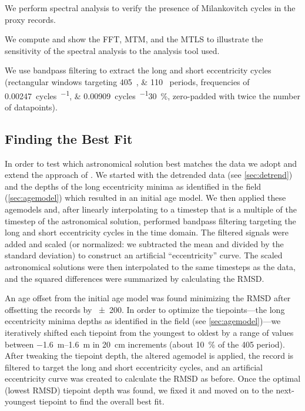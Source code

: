\documentclass[draft]{agujournal2019}
\begin{document}
We perform spectral analysis to verify the presence of Milankovitch cycles in the proxy records.

We compute and show the \gls{FFT}, %
\gls{MTM}, and the \gls{MTLS} to illustrate the sensitivity of the spectral analysis to the analysis tool used.

We use bandpass filtering to extract the long and short eccentricity cycles (rectangular windows targeting \qtylist{405;110}{\kiloyear} periods, frequencies of \qtylist{0.00247;0.00909}{cycles\per\kiloyear}\textpm\qty{30}{\percent}, zero-padded with twice the number of datapoints).

\subsection{Finding the Best Fit}\label{sec:algorithm}

In order to test which astronomical solution best matches the data we adopt and extend the approach of .
We started with the detrended data (see \cref{sec:detrend}) and the depths of the long eccentricity minima as identified in the field (\cref{sec:agemodel}) which resulted in an initial age model.
We then applied these agemodels and, after linearly interpolating to a timestep that is a multiple of the timestep of the astronomical solution, performed bandpass filtering targeting the long and short eccentricity cycles in the time domain.
The filtered signals were added and scaled (or normalized: we subtracted the mean and divided by the standard deviation) to construct an artificial ``eccentricity'' curve.
The scaled astronomical solutions were then interpolated to the same timesteps as the data, and the squared differences were summarized by calculating the \gls{RMSD}.

An age offset from the initial age model was found minimizing the \gls{RMSD} after offsetting the records by \qty{\pm200}{\kiloyear}.
In order to optimize the tiepoints---the long eccentricity minima depths as identified in the field (see \cref{sec:agemodel})---we iteratively shifted each tiepoint from the youngest to oldest by a range of values between \qtyrange[range-phrase=~to~]{-1.6}{1.6}{\metre} in \qty{20}{\centi\metre} increments (about \qty{10}{\percent} of the \qty{405}{\kiloyear} period).
After tweaking the tiepoint depth, the altered agemodel is applied, the record is filtered to target the long and short eccentricity cycles, and an artificial eccentricity curve was created to calculate the \gls{RMSD} as before.
Once the optimal (lowest \gls{RMSD}) tiepoint depth was found, we fixed it and moved on to the next-youngest tiepoint to find the overall best fit.
\end{document}
